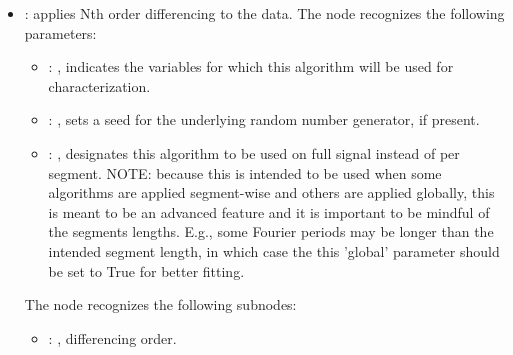 \begin{itemize}
    \item {}:
      applies Nth order differencing to the data.
      The  node recognizes the following parameters:
        \begin{itemize}
          \item {}: , 
            indicates the variables for which this algorithm will be used for characterization.
          \item {}: , 
            sets a seed for the underlying random number generator, if present.
          \item {}: , 
            designates this algorithm to be used on full signal instead of per
            segment. NOTE: because this is intended to be used when some algorithms are
            applied segment-wise and others are applied globally, this is meant to be an
            advanced feature and it is important to be mindful of the segments lengths.
            E.g., some Fourier periods may be longer than the intended segment length, in
            which case the this 'global' parameter should be set to True for better
            fitting. 
      \end{itemize}

      The  node recognizes the following subnodes:
      \begin{itemize}
        \item {}: , 
          differencing order.
      \end{itemize}


\end{itemize}
